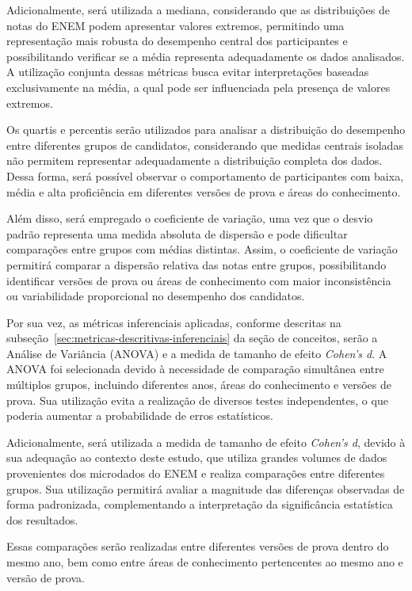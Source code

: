 \documentclass[a4paper,10pt, twocolumn]{article}
\begin{document}
Adicionalmente, será utilizada a mediana, considerando que as distribuições de notas do ENEM podem apresentar valores extremos, permitindo uma representação mais robusta do desempenho central dos participantes e possibilitando verificar se a média representa adequadamente os dados analisados. A utilização conjunta dessas métricas busca evitar interpretações baseadas exclusivamente na média, a qual pode ser influenciada pela presença de valores extremos.

Os quartis e percentis serão utilizados para analisar a distribuição do desempenho entre diferentes grupos de candidatos, considerando que medidas centrais isoladas não permitem representar adequadamente a distribuição completa dos dados. Dessa forma, será possível observar o comportamento de participantes com baixa, média e alta proficiência em diferentes versões de prova e áreas do conhecimento.

Além disso, será empregado o coeficiente de variação, uma vez que o desvio padrão representa uma medida absoluta de dispersão e pode dificultar comparações entre grupos com médias distintas. Assim, o coeficiente de variação permitirá comparar a dispersão relativa das notas entre grupos, possibilitando identificar versões de prova ou áreas de conhecimento com maior inconsistência ou variabilidade proporcional no desempenho dos candidatos.

Por sua vez, as métricas inferenciais aplicadas, conforme descritas na
subseção~\ref{sec:metricas-descritivas-inferenciais} da seção de conceitos, serão a Análise de Variância (ANOVA) e a medida de tamanho de efeito \textit{Cohen's d}. A ANOVA foi selecionada devido à necessidade de comparação simultânea entre múltiplos grupos, incluindo diferentes anos, áreas do conhecimento e versões de prova. Sua utilização evita a realização de diversos testes independentes, o que poderia aumentar a probabilidade de erros estatísticos.

Adicionalmente, será utilizada a medida de tamanho de efeito \textit{Cohen's d}, devido à sua adequação ao contexto deste estudo, que utiliza grandes volumes de dados provenientes dos microdados do ENEM e realiza comparações entre diferentes grupos. Sua utilização permitirá avaliar a magnitude das diferenças observadas de forma padronizada, complementando a interpretação da significância estatística dos resultados.

Essas comparações serão realizadas entre diferentes versões de prova dentro do mesmo ano, bem como entre áreas de conhecimento pertencentes ao mesmo ano e versão de prova.
\end{document}
